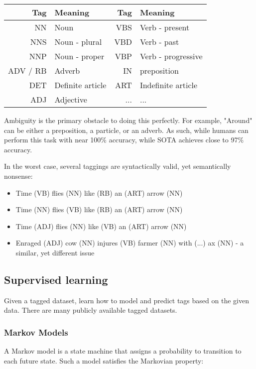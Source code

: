 \documentclass{idc_msc}
\begin{document}
\begin{center}
\begin{tabu} to \linewidth{|r|l|r|l|}
\hline
Tag & Meaning & Tag & Meaning \\
\hline
\hline
NN & Noun & VBS & Verb - present \\
\hline
NNS & Noun - plural & VBD & Verb - past \\
\hline
NNP & Noun - proper & VBP & Verb - progressive \\
\hline
ADV / RB & Adverb & IN & preposition \\
\hline
DET & Definite article & ART & Indefinite article \\
\hline
ADJ & Adjective & ... & ... \\
\hline
\end{tabu}
\end{center}

Ambiguity is the primary obstacle to doing this perfectly.
For example, "Around" can be either a preposition, a particle, or an adverb.
As such, while humans can perform this task with near 100\% accuracy, while SOTA achieves close to 97\% accuracy.

In the worst case, several taggings are syntactically valid, yet semantically nonsense:

\begin{itemize}
  \item Time (VB) flies (NN) like (RB) an (ART) arrow (NN)
  \item Time (NN) flies (VB) like (RB) an (ART) arrow (NN)
  \item Time (ADJ) flies (NN) like (VB) an (ART) arrow (NN)
  \item Enraged (ADJ) cow (NN) injures (VB) farmer (NN) with (...) ax (NN) - a similar, yet different issue
\end{itemize}

\subsection{Supervised learning}

Given a tagged dataset, learn how to model and predict tags based on the given data.
There are many publicly available tagged datasets.

\subsubsection{Markov Models}

A Markov model is a state machine that assigns a probability to transition to each future state.
Such a model satisfies the Markovian property:
\end{document}
